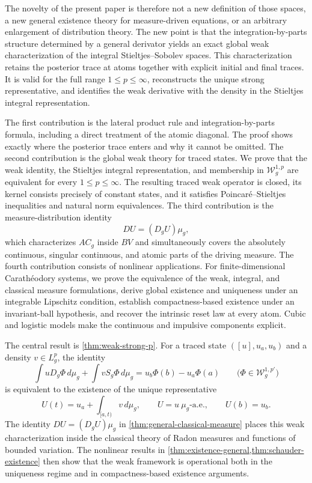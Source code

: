 \documentclass[preprint,12pt]{elsarticle}
\newcommand{\finalrev}[1]{{\color{red}#1}}
\newcommand{\finalrev}[1]{#1}
\theoremstyle{definition}
\theoremstyle{remark}
\begin{document}
The novelty of the present paper is therefore not a new definition of those spaces, a new general existence theory for measure-driven equations, or an arbitrary enlargement of distribution theory. The new point is that the integration-by-parts structure determined by a general derivator yields an exact global weak characterization of the integral Stieltjes--Sobolev spaces. \finalrev{This characterization retains the posterior trace at atoms together with explicit initial and final traces.} It is valid for the full range $1\le p\le\infty$, reconstructs the unique strong representative, and identifies the weak derivative with the density in the Stieltjes integral representation.

The first contribution is the lateral product rule and integration-by-parts formula, including a direct treatment of the atomic diagonal. The proof shows exactly where the posterior trace enters and why it cannot be omitted. The second contribution is the global weak theory for traced states. We prove that the weak identity, the Stieltjes integral representation, and membership in $\mathcal W_g^{1,p}$ are equivalent for every $1\le p\le\infty$. The resulting traced weak operator is closed, its kernel consists precisely of constant states, and it satisfies Poincar\'e--Stieltjes inequalities and natural norm equivalences. The third contribution is the measure-distribution identity
\[
 DU=(D_gU)\mu_g,
\]
which characterizes $AC_g$ inside $BV$ and simultaneously covers the absolutely continuous, singular continuous, and atomic parts of the driving measure. The fourth contribution consists of nonlinear applications. For finite-dimensional Carath\'eodory systems, we prove the equivalence of the weak, integral, and classical measure formulations, derive global existence and uniqueness under an integrable Lipschitz condition, establish compactness-based existence under an invariant-ball hypothesis, and recover the intrinsic reset law at every atom. Cubic and logistic models make the continuous and impulsive components explicit.

The central result is \cref{thm:weak-strong-p}. For a traced state $([u],u_a,u_b)$ and a density $v\in L_g^p$, the identity
\[
 \int uD_g\Phi\,d\mu_g+\int vS_g\Phi\,d\mu_g
 =u_b\Phi(b)-u_a\Phi(a)
 \qquad\bigl(\Phi\in\mathcal W_g^{1,p'}\bigr)
\]
is equivalent to the existence of the unique representative
\[
 U(t)=u_a+\int_{[a,t)}v\,d\mu_g,
 \qquad U=u\ \mu_g\text{-a.e.},\qquad U(b)=u_b.
\]
The identity $DU=(D_gU)\mu_g$ in \cref{thm:general-classical-measure} places this weak characterization inside the classical theory of Radon measures and functions of bounded variation. The nonlinear results in \cref{thm:existence-general,thm:schauder-existence} then show that the weak framework is operational both in the uniqueness regime and in compactness-based existence arguments.
\end{document}
